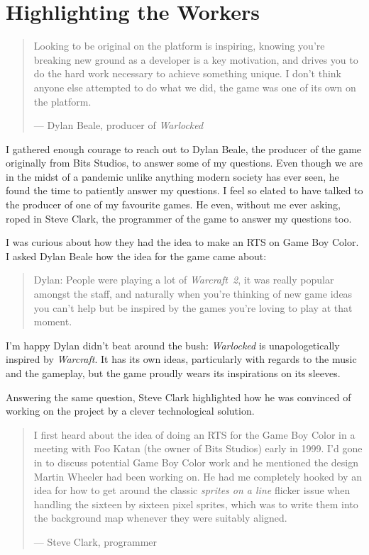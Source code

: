 \documentclass{book}
\begin{document}
\FloatBarrier\needspace{5pt}\section*{Highlighting the Workers}\nopagebreak[4]

\begin{quote}
Looking to be original on the platform is inspiring, knowing you’re breaking new ground as a developer is a key motivation, and drives you to do the hard work necessary to achieve something unique. I don’t think anyone else attempted to do what we did, the game was one of its own on the platform.

— Dylan Beale, producer of \emph{Warlocked}
\end{quote} \par

I gathered enough courage to reach out to Dylan Beale, the producer of the game originally from Bits Studios, to answer some of my questions. Even though we are in the midst of a pandemic unlike anything modern society has ever seen, he found the time to patiently answer my questions. I feel so elated to have talked to the producer of one of my favourite games. He even, without me ever asking, roped in Steve Clark, the programmer of the game to answer my questions too.

I was curious about how they had the idea to make an RTS on Game Boy Color. I asked Dylan Beale how the idea for the game came about:

\begin{quote}
Dylan: People were playing a lot of \emph{Warcraft 2}, it was really popular amongst the staff, and naturally when you’re thinking of new game ideas you can’t help but be inspired by the games you’re loving to play at that moment.
\end{quote} \par

I’m happy Dylan didn’t beat around the bush: \emph{Warlocked} is unapologetically inspired by \emph{Warcraft}. It has its own ideas, particularly with regards to the music and the gameplay, but the game proudly wears its inspirations on its sleeves.

Answering the same question, Steve Clark highlighted how he was convinced of working on the project by a clever technological solution.

\begin{quote}
I first heard about the idea of doing an RTS for the Game Boy Color in a meeting with Foo Katan (the owner of Bits Studios) early in 1999. I’d gone in to discuss potential Game Boy Color work and he mentioned the design Martin Wheeler had been working on. He had me completely hooked by an idea for how to get around the classic \emph{sprites on a line} flicker issue when handling the sixteen by sixteen pixel sprites, which was to write them into the background map whenever they were suitably aligned.

— Steve Clark, programmer
\end{quote} \par
\end{document}
